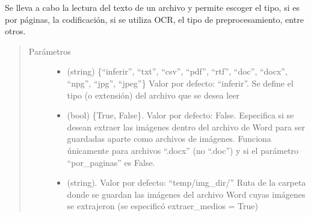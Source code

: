 \documentclass[letterpaper,10pt,openany,spanish]{sphinxmanual}
\begin{document}
\begin{fulllineitems}
\begin{fulllineitems}
\label{\detokenize{funciones/lectura:lectura.Lector.archivo_a_texto}}
Se lleva a cabo la lectura del texto de un archivo y permite escoger el tipo, si es por páginas,             la codificación, si se utiliza OCR, el tipo de preprocesamiento, entre otros.
\begin{quote}\begin{description}
\item[{Parámetros}] \leavevmode\begin{itemize}
\item {} 
 \textendash{} (string) \{“inferir”, “txt”, “csv”, “pdf”, “rtf”, “doc”, “docx”, “npg”,             “jpg”, “jpeg”\} Valor por defecto: “inferir”. Se define el tipo (o extensión) del             archivo que se desea leer

\item {} 
 \textendash{} (bool) \{True, False\}. Valor por defecto: False. Especifica si se desean extraer las             imágenes dentro del archivo de Word para ser guardadas aparte como archivos             de imágenes. Funciona únicamente para archivos “.docx” (no “.doc”) y si el             parámetro “por\_paginas” es False.

\item {} 
 \textendash{} (string). Valor por defecto: “temp/img\_dir/” Ruta de la carpeta             donde se guardan las imágenes del archivo Word cuyas imágenes se extrajeron (se especificó             extraer\_medios = True)


\end{itemize}
\end{description}
\end{quote}
\end{fulllineitems}
\end{fulllineitems}
\end{document}
